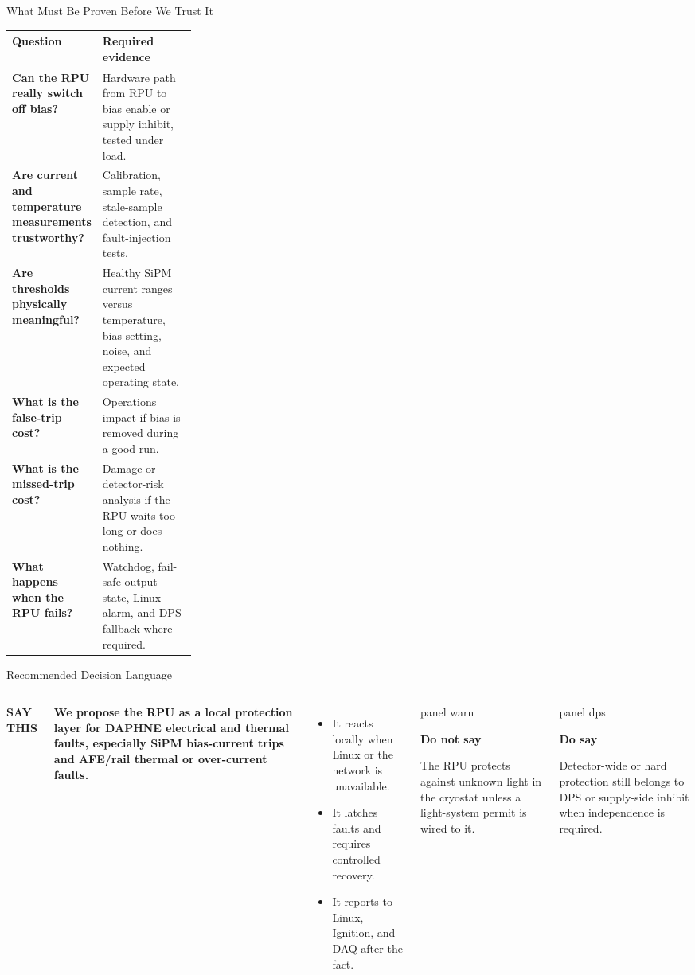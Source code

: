 \documentclass[aspectratio=169,10pt]{beamer}
\newcommand{\eyebrow}[1]{{\color{noircyan}\small\bfseries #1\par}}
\newcommand{\panelbox}[3][panel]{%
  \begin{beamercolorbox}[wd=\linewidth,sep=5pt,rounded=true]{#1}
    {\usebeamercolor[fg]{#1}\bfseries #2\par}
    \vspace{0.35mm}
    {\usebeamercolor[fg]{#1}\footnotesize #3\par}
  \end{beamercolorbox}
}
\begin{document}
\begin{frame}[shrink=8]{What Must Be Proven Before We Trust It}
\small
\begin{tabularx}{\linewidth}{@{}>{\bfseries\color{noircyan}}p{0.27\linewidth}X@{}}
\toprule
Question & Required evidence \\
\midrule
Can the RPU really switch off bias? & Hardware path from RPU to bias enable or supply inhibit, tested under load. \\
\addlinespace
Are current and temperature measurements trustworthy? & Calibration, sample rate, stale-sample detection, and fault-injection tests. \\
\addlinespace
Are thresholds physically meaningful? & Healthy SiPM current ranges versus temperature, bias setting, noise, and expected operating state. \\
\addlinespace
What is the false-trip cost? & Operations impact if bias is removed during a good run. \\
\addlinespace
What is the missed-trip cost? & Damage or detector-risk analysis if the RPU waits too long or does nothing. \\
\addlinespace
What happens when the RPU fails? & Watchdog, fail-safe output state, Linux alarm, and DPS fallback where required. \\
\bottomrule
\end{tabularx}
\end{frame}

\begin{frame}[shrink=8]{Recommended Decision Language}
\begin{columns}[T,onlytextwidth]
    \eyebrow{SAY THIS}
    {\color{white}\bfseries\fontsize{15}{18}\selectfont
    We propose the RPU as a local protection layer for DAPHNE electrical and
    thermal faults, especially SiPM bias-current trips and AFE/rail thermal or
    over-current faults.\par}
    \vspace{3mm}
    \begin{itemize}
      \item It reacts locally when Linux or the network is unavailable.
      \item It latches faults and requires controlled recovery.
      \item It reports to Linux, Ignition, and DAQ after the fact.
    \end{itemize}
    \panelbox[panel warn]{Do not say}{The RPU protects against unknown light in the cryostat unless a light-system permit is wired to it.}
    \vspace{2mm}
    \panelbox[panel dps]{Do say}{Detector-wide or hard protection still belongs to DPS or supply-side inhibit when independence is required.}
\end{columns}
\end{frame}
\end{document}
